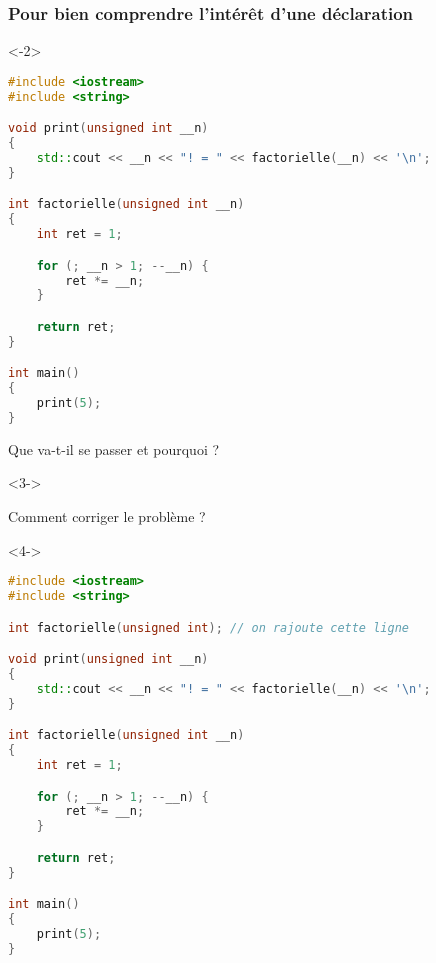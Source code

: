 \documentclass{cppcourses}
\begin{document}
\begin{frame}[fragile]

\frametitle{Pour bien comprendre l'intérêt d'une déclaration}

\begin{example}

\begin{onlyenv}<-2>

\begin{lstlisting}[language = c++]
#include <iostream>
#include <string>

void print(unsigned int __n)
{
    std::cout << __n << "! = " << factorielle(__n) << '\n';
}

int factorielle(unsigned int __n)
{
    int ret = 1;

    for (; __n > 1; --__n) {
        ret *= __n;
    }

    return ret;
}

int main()
{
    print(5);
}
\end{lstlisting}

Que va-t-il se passer et pourquoi ?


\end{onlyenv}

\begin{onlyenv}<3->

Comment corriger le problème ?

\begin{visibleenv}<4->

\begin{lstlisting}[language = c++]
#include <iostream>
#include <string>

int factorielle(unsigned int); // on rajoute cette ligne

void print(unsigned int __n)
{
    std::cout << __n << "! = " << factorielle(__n) << '\n';
}

int factorielle(unsigned int __n)
{
    int ret = 1;

    for (; __n > 1; --__n) {
        ret *= __n;
    }

    return ret;
}

int main()
{
    print(5);
}
\end{lstlisting}

\end{visibleenv}

\end{onlyenv}

\end{example}

\end{frame}
\end{document}
